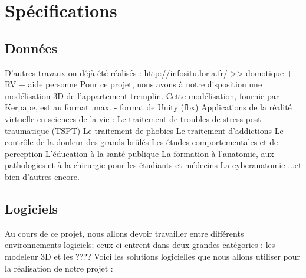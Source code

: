 \section{Spécifications}

\subsection{Données}
	D'autres travaux on déjà été réalisés : http://infositu.loria.fr/ >> domotique + RV + aide personne
	Pour ce projet, nous avons à notre disposition une modélisation 3D de l'appartement tremplin. Cette modélisation, fournie par Kerpape, est au format .max.
	- format de Unity (fbx)
	Applications de la réalité virtuelle en sciences de la vie :
	Le traitement de troubles de stress post-traumatique (TSPT)
	Le traitement de phobies
	Le traitement d'addictions
	Le contrôle de la douleur des grands brûlés
	Les études comportementales et de perception
	L'éducation à la santé publique
	La formation à l'anatomie, aux pathologies et à la chirurgie pour les étudiants et médecins
	La cyberanatomie
	...et bien d'autres encore.

\subsection{Logiciels}
	Au cours de ce projet, nous allons devoir travailler entre différents environnements logiciels; ceux-ci entrent dans deux grandes catégories : les modeleur 3D et les ????
	Voici les solutions logicielles que nous allons utiliser pour la réalisation de notre projet :

